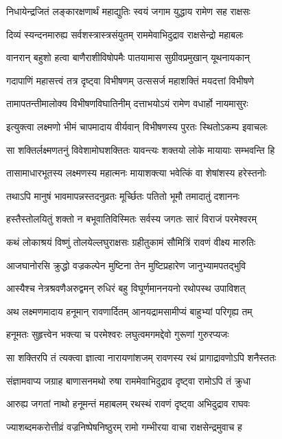 \twolineshloka
{निधायेन्द्रजितं लङ्कारक्षणार्थं महाद्युतिः}
{स्वयं जगाम युद्धाय रामेण सह राक्षसः} %

\twolineshloka
{दिव्यं स्यन्दनमारुह्य सर्वशस्त्रास्त्रसंयुतम्}
{राममेवाभिदुद्राव राक्षसेन्द्रो महाबलः} %

\twolineshloka
{वानरान् बहुशो हत्वा बाणैराशीविषोपमैः}
{पातयामास सुग्रीवप्रमुखान् यूथनायकान्} %

\twolineshloka
{गदापाणिं महासत्त्वं तत्र दृष्ट्वा विभीषणम्}
{उत्ससर्ज महाशक्तिं मयदत्तां विभीषणे} %

\twolineshloka
{तामापतन्तीमालोक्य विभीषणविघातिनीम्}
{दत्ताभयोऽयं रामेण वधार्हो नायमासुरः} %

\twolineshloka
{इत्युक्त्वा लक्ष्मणो भीमं चापमादाय वीर्यवान्}
{विभीषणस्य पुरतः स्थितोऽकम्प इवाचलः} %

\twolineshloka
{सा शक्तिर्लक्ष्मणतनुं विवेशामोघशक्तितः}
{यावन्त्यः शक्तयो लोके मायायाः सम्भवन्ति हि} %

\twolineshloka
{तासामाधारभूतस्य लक्ष्मणस्य महात्मनः}
{मायाशक्त्या भवेत्किं वा शेषांशस्य हरेस्तनोः} %

\twolineshloka
{तथाऽपि मानुषं भावमापन्नस्तदनुव्रतः}
{मूर्च्छितः पतितो भूमौ तमादातुं दशाननः} %

\twolineshloka
{हस्तैस्तोलयितुं शक्तो न बभूवातिविस्मितः}
{सर्वस्य जगतः सारं विराजं परमेश्वरम्} %

\twolineshloka
{कथं लोकाश्रयं विष्णुं तोलयेल्लघुराक्षसः}
{ग्रहीतुकामं सौमित्रिं रावणं वीक्ष्य मारुतिः} %

\twolineshloka
{आजघानोरसि क्रुद्धो वज्रकल्पेन मुष्टिना}
{तेन मुष्टिप्रहारेण जानुभ्यामपतद्भुवि} %

\twolineshloka
{आस्यैश्च नेत्रश्रवणैअरुद्वमन् रुधिरं बहु}
{विघूर्णमाननयनो रथोपस्थ उपाविशत्} %

\twolineshloka
{अथ लक्ष्मणमादाय हनूमान् रावणार्दितम्}
{आनयद्रामसामीप्यं बाहुभ्यां परिगृह्य तम्} %

\twolineshloka
{हनूमतः सुहृत्त्वेन भक्त्या च परमेश्वरः}
{लघुत्वमगमद्देवो गुरूणां गुरुरप्यजः} %

\twolineshloka
{सा शक्तिरपि तं त्यक्त्वा ज्ञात्वा नारायणांशजम्}
{रावणस्य रथं प्रागाद्रावणोऽपि शनैस्ततः} %

\twolineshloka
{संज्ञामवाप्य जग्राह बाणासनमथो रुषा}
{राममेवाभिदुद्राव दृष्ट्वा रामोऽपि तं क्रुधा} %

\twolineshloka
{आरुह्य जगतां नाथो हनूमन्तं महाबलम्}
{रथस्थं रावणं दृष्ट्वा अभिदुद्राव राघवः} %

\twolineshloka
{ज्याशब्दमकरोत्तीव्रं वज्रनिष्पेषनिष्ठुरम्}
{रामो गम्भीरया वाचा राक्षसेन्द्रमुवाच ह} %

